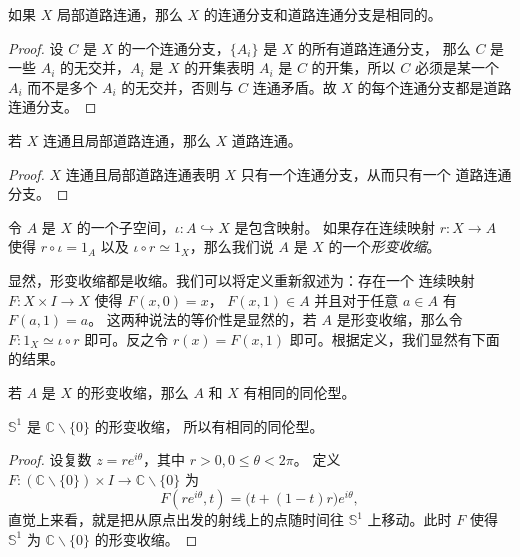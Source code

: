 \documentclass[fontset=none]{Notes}
\begin{document}
\begin{corollary}
  如果 $X$ 局部道路连通，那么 $X$ 的连通分支和道路连通分支是相同的。
\end{corollary}
\begin{proof}
  设 $C$ 是 $X$ 的一个连通分支，$\{A_i\}$ 是 $X$ 的所有道路连通分支，
  那么 $C$ 是一些 $A_i$ 的无交并，$A_i$ 是 $X$ 的开集表明 $A_i$
  是 $C$ 的开集，所以 $C$ 必须是某一个 $A_i$ 而不是多个 $A_i$
  的无交并，否则与 $C$ 连通矛盾。故 $X$ 的每个连通分支都是道路连通分支。
\end{proof}

\begin{corollary}
  若 $X$ 连通且局部道路连通，那么 $X$ 道路连通。
\end{corollary}
\begin{proof}
  $X$ 连通且局部道路连通表明 $X$ 只有一个连通分支，从而只有一个
  道路连通分支。
\end{proof}

\begin{definition}
  令 $A$ 是 $X$ 的一个子空间，$\iota:A\hookrightarrow X$ 是包含映射。
  如果存在连续映射 $r:X\to A$ 使得 $r\circ \iota=1_A$
  以及 $\iota\circ r\simeq 1_X$，那么我们说 $A$ 是 $X$
  的一个\emph{形变收缩}。
\end{definition}

显然，形变收缩都是收缩。我们可以将定义重新叙述为：存在一个
连续映射 $F:X\times I\to X$ 使得 $F(x,0)=x$，
$F(x,1)\in A$ 并且对于任意 $a\in A$ 有 $F(a,1)=a$。
这两种说法的等价性是显然的，若 $A$ 是形变收缩，那么令
$F:1_X\simeq \iota\circ r$ 即可。反之令 $r(x)=F(x,1)$
即可。根据定义，我们显然有下面的结果。

\begin{theorem}
  若 $A$ 是 $X$ 的形变收缩，那么 $A$ 和 $X$ 有相同的同伦型。
\end{theorem}

\begin{corollary}
  $\mathbb{S}^1$ 是 $\mathbb{C}\smallsetminus\{0\}$ 的形变收缩，
  所以有相同的同伦型。
\end{corollary}
\begin{proof}
  设复数 $z=re^{i\theta}$，其中 $r>0,0\leq \theta<2\pi$。
  定义 $F:(\mathbb{C}\smallsetminus\{0\})\times I\to \mathbb{C}\smallsetminus\{0\}$
  为
  \[
    F(re^{i\theta},t)=\bigl(t+(1-t)r\bigr)e^{i\theta},
  \]
  直觉上来看，就是把从原点出发的射线上的点随时间往 $\mathbb{S}^1$
  上移动。此时 $F$ 使得 $\mathbb{S}^1$ 为 $\mathbb{C}\smallsetminus\{0\}$
  的形变收缩。
\end{proof}
\end{document}
